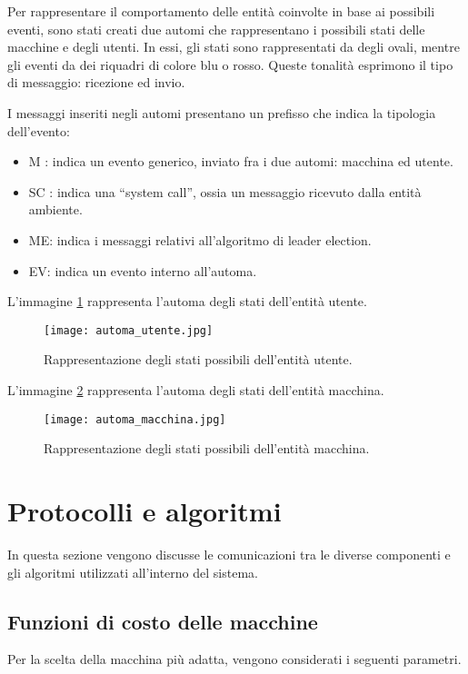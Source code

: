Per rappresentare il comportamento delle entità coinvolte in base ai possibili eventi, sono stati creati due automi che rappresentano i possibili stati delle macchine e degli utenti. In essi, gli stati sono rappresentati da degli ovali, mentre gli eventi da dei riquadri di colore blu o rosso. Queste tonalità esprimono il tipo di messaggio: ricezione ed invio.

I  messaggi inseriti negli automi presentano un prefisso che indica la tipologia dell'evento:
\begin{itemize}
	\item M : indica un evento generico, inviato fra i due automi: macchina ed utente.
	\item SC : indica una ``system call'', ossia un messaggio ricevuto dalla entità ambiente.
	\item ME: indica i messaggi relativi all'algoritmo di leader election.
	\item EV: indica un evento interno all'automa.
\end{itemize}

L'immagine \ref{fig:automa_utente} rappresenta l'automa degli stati dell'entità utente.
\begin{figure}[htbp]
	\centering
	\texttt{[image: automa\_utente.jpg]}
	\caption{Rappresentazione degli stati possibili dell'entità utente.}
	\label{fig:automa_utente}
\end{figure}

L'immagine \ref{fig:automa_macchina} rappresenta l'automa degli stati dell'entità macchina.


\begin{figure}[htbp]
	\centering
	\texttt{[image: automa\_macchina.jpg]}
	\caption{Rappresentazione degli stati possibili dell'entità macchina.}
	\label{fig:automa_macchina}
\end{figure}

\newpage

\section{Protocolli e algoritmi}
In questa sezione vengono discusse le comunicazioni tra le diverse componenti e gli algoritmi utilizzati all'interno del sistema.

\subsection{Funzioni di costo delle macchine} \label{funzioni_di_costo_macchine}
Per la scelta della macchina più adatta, vengono considerati i seguenti parametri.

